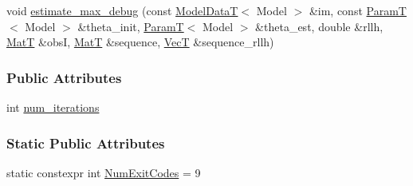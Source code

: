 \begin{DoxyCompactItemize}
\item 
void \hyperlink{classmappel_1_1Estimator_a4a581372a320f1c13eeffacf6309911b}{estimate\+\_\+max\+\_\+debug} (const \hyperlink{namespacemappel_a97f050df953605381ae9c901c3b125f1}{Model\+DataT}$<$ Model $>$ \&im, const \hyperlink{namespacemappel_a667925cb0d6c0e49f2f035cc5a9a6857}{ParamT}$<$ Model $>$ \&theta\+\_\+init, \hyperlink{namespacemappel_a667925cb0d6c0e49f2f035cc5a9a6857}{ParamT}$<$ Model $>$ \&theta\+\_\+est, double \&rllh, \hyperlink{namespacemappel_a7091ab87c528041f7e2027195fad8915}{MatT} \&obsI, \hyperlink{namespacemappel_a7091ab87c528041f7e2027195fad8915}{MatT} \&sequence, \hyperlink{namespacemappel_a2225ad69f358daa3f4f99282a35b9a3a}{VecT} \&sequence\+\_\+rllh)
\end{DoxyCompactItemize}
\subsubsection*{Public Attributes}
\begin{DoxyCompactItemize}
\item 
int \hyperlink{classmappel_1_1CGaussMLE_a459a28314464b8cd80ff2e4d08dbbeb6}{num\+\_\+iterations}
\end{DoxyCompactItemize}
\subsubsection*{Static Public Attributes}
\begin{DoxyCompactItemize}
\item 
static constexpr int \hyperlink{classmappel_1_1Estimator_afcec036c4d78c12d427e0a733a00a48e}{Num\+Exit\+Codes} = 9
\end{DoxyCompactItemize}
